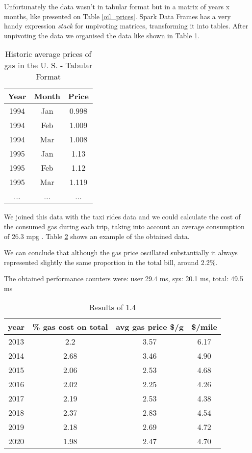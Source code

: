 \documentclass[conference,compsoc]{IEEEtran}
\begin{document}
Unfortunately the data wasn't in tabular format but in a matrix of years x months, like presented on Table \ref{oil_prices}. Spark Data Frames has a very handy expression \textit{stack} for unpivoting matrices, transforming it into tables. After unpivoting the data we organised the data like shown in Table \ref{oil_prices_tabular}.

\begin{table}[!t]
\renewcommand{\arraystretch}{1.3}
\caption{Historic average prices of gas in the U. S.\cite{IEEEhowto:oil_price} - Tabular Format }
\label{oil_prices_tabular}
\centering
\begin{tabular}{c|c||c}
\hline
\bfseries Year& \bfseries Month& \bfseries Price\\
\hline\hline
1994&  Jan&0.998\\
1994&  Feb&1.009\\
1994&  Mar&1.008\\
1995&  Jan& 1.13\\
1995&  Feb& 1.12\\
1995&  Mar&1.119\\
...&  ...&...\\
\hline
\end{tabular}
\end{table}

We joined this data with the taxi rides data and we could calculate the cost of the consumed gas during each trip, taking into account an average consumption of 26.3 mpg \cite{IEEEhowto:fuel_eco}. Table \ref{output_1_4} shows an example of the obtained data. \par
We can conclude that although the gas price oscillated substantially it always represented slightly the same proportion in the total bill, around 2.2\%.
\par\par
The obtained performance counters were: user 29.4 ms, sys: 20.1 ms, total: 49.5 ms

\begin{table}[!t]
\renewcommand{\arraystretch}{1.3}
\caption{Results of 1.4}
\label{output_1_4}
\centering
\begin{tabular}{c||c|c|c}
\hline
\bfseries year & \bfseries \% gas cost on total& \bfseries avg gas price \$/g & \bfseries \$/mile\\
\hline\hline
2013&2.2                &3.57             &6.17  \\
2014&2.68               &3.46             &4.90   \\
2015&2.06               &2.53             &4.68  \\
2016&2.02               &2.25             &4.26  \\
2017&2.19               &2.53             &4.38  \\
2018&2.37               &2.83             &4.54  \\
2019&2.18               &2.69             &4.72  \\
2020&1.98               &2.47             &4.70   \\
\hline
\end{tabular}
\end{table}
\end{document}
